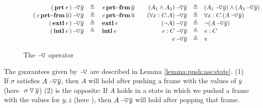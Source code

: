 {{\begin{figure}[hbt]
$
\begin{array}{c}
\begin{array}{l}
\begin{array}{rclcrcl}
  \PushAS y {(\inside \re)} & \triangleq &  \protectedFrom \re {\overline {y} }
  & &
  \PushAS y   {(A_1  \wedge  A_2)} & \triangleq &  (\PushAS y  { A_1})  \wedge  ( \PushAS y  {A_2} )  
\\ 
 \PushAS y {(\protectedFrom \re {\overline {u}})} &  \triangleq& \protectedFrom \re {\overline {u}} 
  & &
 \PushAS y  {(\forall x:C.A)} & \triangleq & \forall x:C.({\PushAS y A} )  
  \\  
    \PushAS y  {(\external \re)} & \triangleq &   {\external \re}
  & & 
    \PushAS y  {(\neg A)} &  \triangleq & \neg( {\PushAS y A} )  
    \\
    \PushAS y  {(\internal \re)} &  \triangleq & {\internal \re}
    & &
    \PushAS y  {\re:C} &  \triangleq&   \re:C 
\\  & & & &
     \PushAS y  {\re} &  \triangleq&   \re
 \end{array}
\end{array}
\end{array}
$
\caption{The $\pushSymbolAA$  operator  } 
\label{f:Push}
\end{figure}


\newcommand{\sigmas}{\widetilde \sigma}



\vspace{.1cm}

The guarantees given by $\pushSymbolAA$ are described in Lemma \ref{lemma:push:ass:state}. (1) If  %
$\sigma$ satisfies  $\PushAS y A$, then   $A$ will hold after pushing a frame with the values of $\overline y$ (here $\PushS {y} {\sigma}$)
(2) is the opposite: If $A$ holds in a state in which we pushed a frame with the values for $\overline y, \overline z$ 
(here  \sigma), then $\PushAS {y} {A}$ will hold  after popping that frame.

}}
